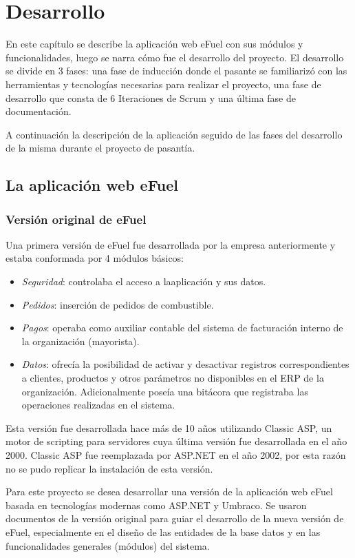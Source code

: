 \chapter{Desarrollo} \label{development}
En este capítulo se describe la aplicación web eFuel con sus módulos y funcionalidades, luego se narra cómo fue el desarrollo del proyecto. El desarrollo se divide en 3 fases: una fase de inducción donde el pasante se familiarizó con las herramientas y tecnologías necesarias para realizar el proyecto, una fase de desarrollo que consta de 6 Iteraciones de Scrum y una última fase de documentación.

A continuación la descripción de la aplicación seguido de las fases del desarrollo de la misma durante el proyecto de pasantía.

\section{La aplicación web eFuel}
\subsection{Versión original de eFuel}
Una primera versión de eFuel fue desarrollada por la empresa anteriormente y estaba  conformada por 4 módulos básicos:

\begin{itemize}
    \item \emph{Seguridad}: controlaba el acceso a laaplicación y sus datos.
    \item \emph{Pedidos}: inserción de pedidos de combustible.
    \item \emph{Pagos}: operaba como auxiliar contable del sistema de facturación interno de la organización (mayorista). 
    \item \emph{Datos}: ofrecía la posibilidad de activar y desactivar registros correspondientes a clientes, productos y otros parámetros no disponibles en el ERP de la organización. Adicionalmente poseía una bitácora que registraba las operaciones realizadas en el sistema.
\end{itemize}

Esta versión fue desarrollada hace más de 10 años utilizando Classic ASP, un motor de scripting para servidores cuya última versión fue desarrollada en el año 2000. Classic ASP fue reemplazada por ASP.NET en el año 2002, por esta razón no se pudo replicar la instalación de esta versión.

Para este proyecto se desea desarrollar una versión de la aplicación web eFuel basada en tecnologías modernas como ASP.NET y Umbraco. Se usaron documentos de la versión original para guiar el desarrollo de la nueva versión de eFuel, especialmente en el diseño de las entidades de la base datos y en las funcionalidades generales (módulos) del sistema.

